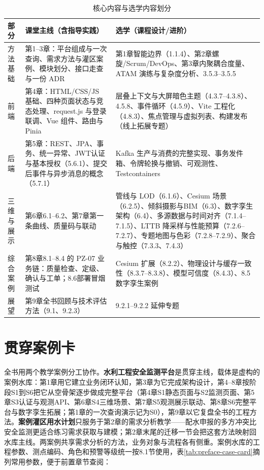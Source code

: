 \begin{table}[htbp]
\centering
\caption{核心内容与选学内容划分}
\label{tab:preface-core-optional}
\begin{tabular}{p{2.2cm}p{5.6cm}p{5.6cm}}
\toprule
部分 & 课堂主线（含指导实践） & 选学（课程设计/进阶） \\
\midrule
方法基础 & 第1--3章：平台组成与一次查询、需求方法与灌区案例、模块划分、接口走查与一份 ADR & 第1章智能边界（1.1.4）、第2章螺旋/Scrum/DevOps、第3章内聚耦合度量、ATAM 演练与复杂度分析、3.5.3--3.5.5 \\
前端 & 第4章：HTML/CSS/JS 基础、四种页面状态与竞态处理、request.js 与登录联调、Vue 组件、路由与 Pinia & 层叠上下文与大屏暗色主题（4.3.7--4.3.8）、4.5.8、事件循环（4.5.9）、Vite 工程化（4.8.3）、焦点管理与虚拟列表、构建发布（线上拓展专题） \\
后端 & 第5章：REST、JPA、事务、统一异常、JWT认证与基本授权（5.6.1）、提交后事件与异步消息的概念（5.7.1） & Kafka 生产与消费的完整实现、事务发件箱、令牌轮换与撤销、可观测性、Testcontainers \\
三维与展示 & 第6章6.1--6.2、第7章第一条曲线、质量码与联动 & 管线与 LOD（6.1.6）、Cesium 场景（6.2.5）、倾斜摄影与BIM（6.3）、数字孪生架构（6.4）、多源数据与时间对齐（7.1.4--7.1.5）、LTTB 降采样与性能预算（7.2.6--7.2.7）、专题地图与色彩（7.2.8--7.2.9）、聚合与触控（7.3.3、7.4.3） \\
综合案例 & 第8章8.1--8.4 的 PZ-07 业务链：质量检查、定级、确认与工单；8.6部署冒烟测试 & Cesium 扩展（8.2.2）、物理设计与缓存一致性（8.3.7--8.3.8）、模型可信度（8.4.3）、8.5数字孪生案例 \\
展望 & 第9章全书回顾与技术评估方法（9.1、9.2.3） & 9.2.1--9.2.2 延伸专题 \\
\bottomrule
\end{tabular}
\end{table}

\section*{贯穿案例卡}

全书用两个教学案例分工协作。\textbf{水利工程安全监测平台}是贯穿主线，载体是虚构的案例水库：第1章用它建立业务闭环认知，第3章为它完成架构设计，第4--8章按阶段S1到S6把它从空骨架逐步做成完整平台（第4章S1静态页面与S2监测页面、第5章S3认证与观测API、第6章S4三维场景、第7章S5观测展示联动、第8章S6完整平台与数字孪生拓展；第1章的一次查询演示记为S0），第9章以它复盘全书的工程方法。\textbf{案例灌区用水计划}只服务于第2章的需求分析教学——配水申报的多方冲突比安全监测更适合练习需求获取与建模；第2章末尾的迁移一节会把这套方法映射回水库主线。两案例共享需求分析的方法，业务对象与流程各有侧重。案例水库的工程参数、测点编码、角色和预警等级统一按8.1节使用，表\ref{tab:preface-case-card}摘列常用参数，便于前置章节查阅：

